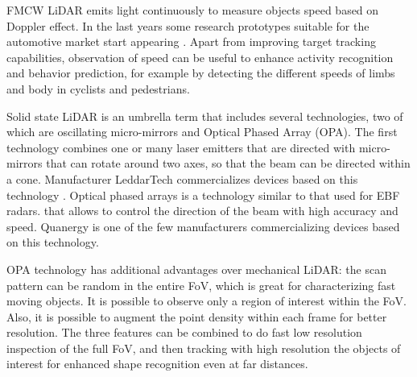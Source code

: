 
FMCW LiDAR \cite{Nordin2004} emits light continuously to measure objects speed
based on Doppler effect. In the last years some research prototypes suitable for
the automotive market start appearing \cite{Poulton2016}.
Apart from improving target tracking capabilities, observation of speed can
be useful to enhance activity recognition and behavior prediction, for example 
by detecting the different speeds of limbs and body in cyclists and pedestrians.


Solid state LiDAR is an umbrella term that includes several technologies, two 
of which are oscillating micro-mirrors and Optical Phased Array (OPA).
The first technology combines one or many laser emitters that are directed
with micro-mirrors that can rotate around two axes, so that the beam 
can be directed within a cone. Manufacturer LeddarTech commercializes devices
based on this technology \cite{LeddarTech2016}.
Optical phased arrays \cite{McManamon1996} is a technology similar to that used 
for EBF radars. 
that allows to control the direction of the beam with high accuracy and speed.
Quanergy \cite{Eldada2017} is one of the few manufacturers commercializing
devices based on this technology.

OPA technology has additional advantages over mechanical LiDAR: the scan 
pattern can be random in the entire FoV, which is great for characterizing fast 
moving objects. It is possible to observe only a region of interest within the 
FoV. Also, it is possible to augment the point density within each frame for 
better resolution. The three features can be combined to do fast low resolution 
inspection of the full FoV, and then tracking with high resolution the objects
of interest for enhanced shape recognition even at far distances.

